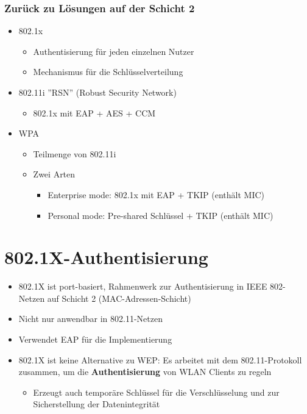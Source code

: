 \documentclass[openany]{book}
\begin{document}
\subsubsection{Zurück zu Lösungen auf der Schicht 2}

\begin{itemize}
    \item 802.1x
    \begin{itemize}
        \item Authentisierung für jeden einzelnen Nutzer
        \item Mechanismus für die Schlüsselverteilung
    \end{itemize}
    \item 802.11i ''RSN'' (Robust Security Network)
    \begin{itemize}
        \item 802.1x mit EAP + AES + CCM
    \end{itemize}
    \item WPA
    \begin{itemize}
        \item Teilmenge von 802.11i
        \item Zwei Arten
        \begin{itemize}
            \item Enterprise mode: 802.1x mit EAP + TKIP (enthält MIC)
            \item Personal mode: Pre-shared Schlüssel + TKIP (enthält MIC)
        \end{itemize}
    \end{itemize}
\end{itemize}

\section{802.1X-Authentisierung}

\begin{itemize}
    \item 802.1X ist port-basiert, Rahmenwerk zur Authentisierung in IEEE 802-Netzen auf Schicht 2 (MAC-Adressen-Schicht)
    \item Nicht nur anwendbar in 802.11-Netzen
    \item Verwendet EAP für die Implementierung
    \item 802.1X ist keine Alternative zu WEP: Es arbeitet mit dem 802.11-Protokoll zusammen, um die \textbf{Authentisierung} von WLAN Clients zu regeln
    \begin{itemize}
        \item Erzeugt auch temporäre Schlüssel für die Verschlüsselung und zur Sicherstellung der Datenintegrität
    \end{itemize} 
\end{itemize}
\end{document}
